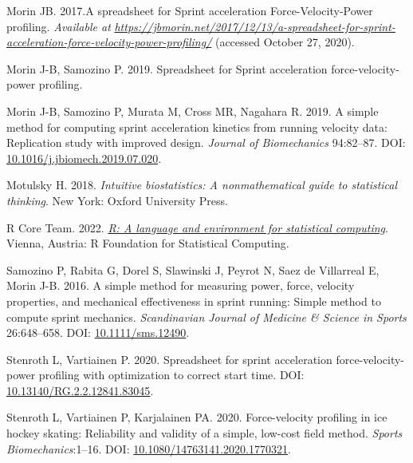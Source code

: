 \documentclass[fleqn,10pt,lineno]{wlpeerj} %
\newlength{\cslhangindent}
\newlength{\cslentryspacingunit} %
\newenvironment{CSLReferences}[2] %
 {%
  \setlength{\parindent}{0pt}
  \ifodd #1
  \let\oldpar\par
  \def\par{\hangindent=\cslhangindent\oldpar}
  \fi
  \setlength{\parskip}{#2\cslentryspacingunit}
 }%
 {}
\begin{document}
\begin{CSLReferences}{1}{0}
\leavevmode{}%
Morin JB. 2017.A spreadsheet for {Sprint} acceleration {Force}-{Velocity}-{Power} profiling. \emph{Available at} \href{https://jbmorin.net/2017/12/13/a-spreadsheet-for-sprint-acceleration-force-velocity-power-profiling/}{\emph{https://jbmorin.net/2017/12/13/a-spreadsheet-for-sprint-acceleration-force-velocity-power-profiling/}} (accessed October 27, 2020).

\leavevmode{}%
Morin J-B, Samozino P. 2019. Spreadsheet for {Sprint} acceleration force-velocity-power profiling.

\leavevmode{}%
Morin J-B, Samozino P, Murata M, Cross MR, Nagahara R. 2019. A simple method for computing sprint acceleration kinetics from running velocity data: {Replication} study with improved design. \emph{Journal of Biomechanics} 94:82--87. DOI: \href{https://doi.org/10.1016/j.jbiomech.2019.07.020}{10.1016/j.jbiomech.2019.07.020}.

\leavevmode{}%
Motulsky H. 2018. \emph{Intuitive biostatistics: A nonmathematical guide to statistical thinking}. {New York}: {Oxford University Press}.

\leavevmode{}%
R Core Team. 2022. \emph{\href{https://www.R-project.org/}{R: A language and environment for statistical computing}}. Vienna, Austria: R Foundation for Statistical Computing.

\leavevmode{}%
Samozino P, Rabita G, Dorel S, Slawinski J, Peyrot N, Saez de Villarreal E, Morin J-B. 2016. A simple method for measuring power, force, velocity properties, and mechanical effectiveness in sprint running: {Simple} method to compute sprint mechanics. \emph{Scandinavian Journal of Medicine \& Science in Sports} 26:648--658. DOI: \href{https://doi.org/10.1111/sms.12490}{10.1111/sms.12490}.

\leavevmode{}%
Stenroth L, Vartiainen P. 2020. Spreadsheet for sprint acceleration force-velocity-power profiling with optimization to correct start time. DOI: \href{https://doi.org/10.13140/RG.2.2.12841.83045}{10.13140/RG.2.2.12841.83045}.

\leavevmode{}%
Stenroth L, Vartiainen P, Karjalainen PA. 2020. Force-velocity profiling in ice hockey skating: Reliability and validity of a simple, low-cost field method. \emph{Sports Biomechanics}:1--16. DOI: \href{https://doi.org/10.1080/14763141.2020.1770321}{10.1080/14763141.2020.1770321}.


\end{CSLReferences}
\end{document}
